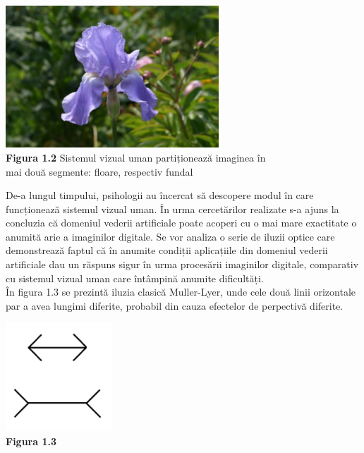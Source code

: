 \documentclass[a4paper,12pt]{report}
\newcommand\tab[1][1cm]{\hspace*{#1}}
\begin{document}
\begin {center} 
	\begin {footnotesize} 
		\includegraphics[width = 80mm]{fig1_2} \\
		\textbf  {Figura 1.2} Sistemul vizual uman partiționează imaginea în \\ mai două segmente: floare, respectiv fundal
	\end {footnotesize} 
\end {center}
\tab De-a lungul timpului, psihologii au încercat să descopere modul în care funcționează sistemul vizual uman. În urma cercetărilor realizate s-a ajuns la concluzia că domeniul vederii artificiale
poate acoperi cu o mai mare exactitate o anumită arie a imaginilor digitale. 
\newline \tab Se vor analiza o serie de iluzii optice care demonstrează faptul că în anumite condiții aplicațiile din domeniul vederii artificiale dau un răspuns sigur în urma procesării imaginilor digitale, comparativ
cu sistemul vizual uman care întâmpină anumite dificultăți. \\ \tab În figura 1.3 se prezintă iluzia clasică Muller-Lyer, unde cele două linii orizontale par a avea lungimi diferite, probabil din cauza 
efectelor de perpectivă diferite.  
\newline
\begin {center} 
	\begin {footnotesize} 
		\includegraphics[width = 40mm]{fig1_3} \\
		\textbf  {Figura 1.3} 
	\end {footnotesize} 
\end {center}
\end{document}
